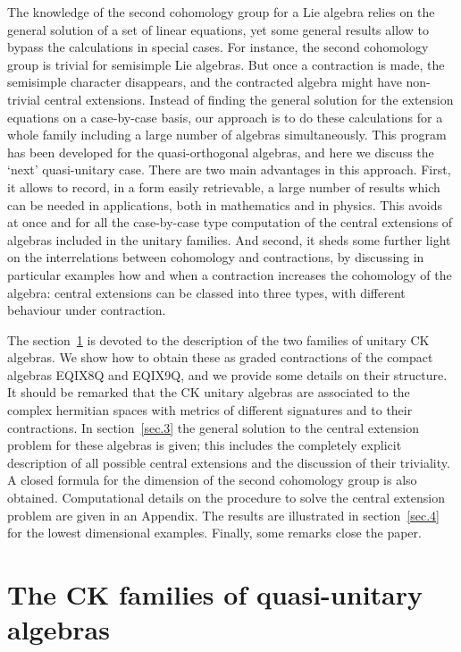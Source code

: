 The knowledge of the second cohomology
group for a Lie algebra relies on the general solution of a set of linear
equations, yet some general results allow to bypass the calculations in
special cases. For instance, the second cohomology group is trivial for
semisimple Lie algebras. But once a contraction is made, the semisimple
character disappears, and the contracted algebra might have non-trivial central
extensions. Instead of finding the general solution for the extension equations
on a case-by-case basis, our approach is to do these calculations for a
whole family including a large number of algebras simultaneously. This program
has been developed for the quasi-orthogonal algebras, and here we discuss the
`next' quasi-unitary case. There are two main advantages in this approach.
First, it allows to record, in a form easily retrievable, a large number of
results which can be needed in applications, both in mathematics and in
physics. This avoids at once and for all the case-by-case type computation of
the
central extensions of algebras included in the unitary families. And second, it
sheds some further light on the interrelations between cohomology and
contractions, by discussing in particular examples how and when a contraction
increases the cohomology of the algebra: central extensions can be classed into
three types, with different behaviour under contraction.

The section~\ref{sec.2} is devoted to the description of the  two families of
unitary CK algebras. We show how to obtain these as graded contractions of the
compact algebras EQIX8Q and
EQIX9Q, and we provide some details on their structure. It should be remarked
that the CK unitary algebras are associated to the complex hermitian spaces
with metrics of different signatures and to their contractions. In
section~\ref{sec.3} the general solution to the central extension problem for
these algebras is given; this includes the completely explicit description of
all possible central extensions and the discussion of their triviality. A
closed formula for the dimension of the second cohomology group is also
obtained. Computational details on the procedure to
solve the central extension problem are given in an Appendix. The results are
illustrated in section~\ref{sec.4} for the lowest dimensional examples.
Finally, some remarks close the paper.

\section{The CK families of quasi-unitary algebras}
\label{sec.2}


